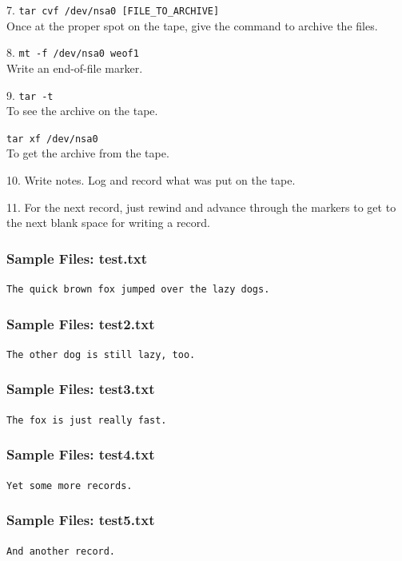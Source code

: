 7. \texttt{tar cvf /dev/nsa0 [FILE\_TO\_ARCHIVE]}\\
Once at the proper spot on the tape, give the command to archive the files.

8.  \texttt{mt -f  /dev/nsa0 weof1}\\
Write an end-of-file marker.

9.  \texttt{tar -t}\\
To see the archive on the tape.

\texttt{tar xf /dev/nsa0}\\
To get the archive from the tape.

10.  Write notes.  Log and record what was put on the tape.

11.  For the next record, just rewind and advance through the markers to get to the next blank space for writing a record.

\subsubsection{Sample Files: test.txt }
\texttt{The quick brown fox jumped over the lazy dogs.}
\subsubsection{Sample Files:  test2.txt}
\texttt{The other dog is still lazy, too.}
\subsubsection{Sample Files:  test3.txt}
\texttt{The fox is just really fast.}
\subsubsection{Sample Files:  test4.txt}
\texttt{Yet some more records.}
\subsubsection{Sample Files:  test5.txt}
\texttt{And another record.}
